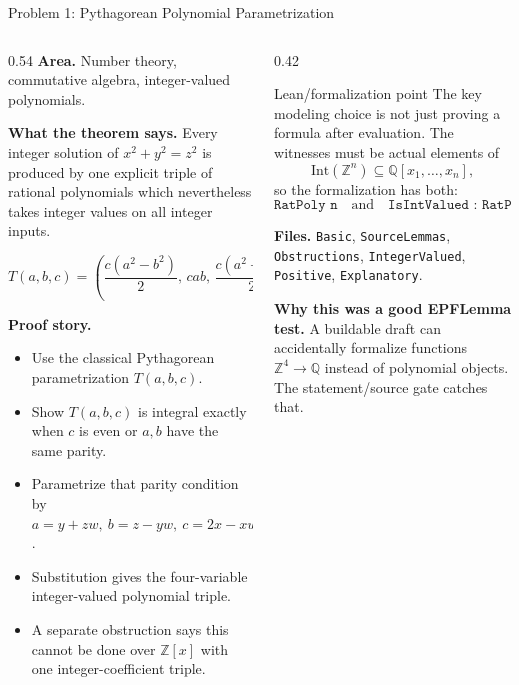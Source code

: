 \documentclass[aspectratio=169,10pt]{beamer}
\begin{document}
\begin{frame}[t]{Problem 1: Pythagorean Polynomial Parametrization}
\begin{columns}[T,onlytextwidth]
  \begin{column}{0.54\textwidth}
    \scriptsize
    \textbf{Area.} Number theory, commutative algebra, integer-valued polynomials.

    \textbf{What the theorem says.}
    Every integer solution of \(x^2+y^2=z^2\) is produced by one explicit triple
    of rational polynomials which nevertheless takes integer values on all
    integer inputs.

    \[
      T(a,b,c)=
      \left(\frac{c(a^2-b^2)}{2},\, cab,\,
      \frac{c(a^2+b^2)}{2}\right)
    \]

    \textbf{Proof story.}
    \begin{itemize}
      \item Use the classical Pythagorean parametrization \(T(a,b,c)\).
      \item Show \(T(a,b,c)\) is integral exactly when \(c\) is even or \(a,b\)
        have the same parity.
      \item Parametrize that parity condition by
        \(a=y+zw,\ b=z-yw,\ c=2x-xw\).
      \item Substitution gives the four-variable integer-valued polynomial triple.
      \item A separate obstruction says this cannot be done over \(\mathbb{Z}[x]\)
        with one integer-coefficient triple.
    \end{itemize}
  \end{column}
  \begin{column}{0.42\textwidth}
    \begin{block}{Lean/formalization point}
      \scriptsize
      The key modeling choice is not just proving a formula after evaluation.
      The witnesses must be actual elements of
      \[
        \mathrm{Int}(\mathbb{Z}^n)\subseteq \mathbb{Q}[x_1,\ldots,x_n],
      \]
      so the formalization has both:
      \[
        \texttt{RatPoly n}
        \quad\text{and}\quad
        \texttt{IsIntValued : RatPoly n -> Prop}.
      \]
    \end{block}

    \vspace{1mm}
    \scriptsize
    \textbf{Files.}
    \texttt{Basic}, \texttt{SourceLemmas}, \texttt{Obstructions},
    \texttt{IntegerValued}, \texttt{Positive}, \texttt{Explanatory}.

    \vspace{1mm}
    \textbf{Why this was a good EPFLemma test.}
    A buildable draft can accidentally formalize functions
    \(\mathbb{Z}^4\to\mathbb{Q}\) instead of polynomial objects. The
    statement/source gate catches that.
  \end{column}
\end{columns}
\end{frame}
\end{document}
